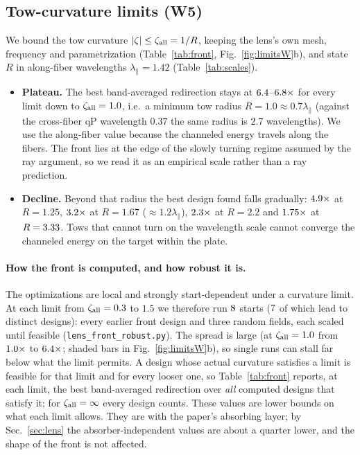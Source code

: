 \subsection{Tow-curvature limits (W5)}\label{sec:front}
We bound the tow curvature $|\zeta|\le\zeta_{\rm all}=1/R$, keeping the lens's own mesh, frequency and
parametrization (Table~\ref{tab:front}, Fig.~\ref{fig:limitsW}b), and state $R$ in along-fiber wavelengths
$\lambda_\parallel=1.42$ (Table~\ref{tab:scales}).
\begin{itemize}[itemsep=1pt]
\item \textbf{Plateau.} The best band-averaged redirection stays at $6.4$--$6.8\times$ for every
  limit down to $\zeta_{\rm all}=1.0$, i.e.\ a minimum tow radius $R=1.0\approx0.7\lambda_\parallel$ (against the
  cross-fiber qP wavelength $0.37$ the same radius is $2.7$ wavelengths). We use the along-fiber value
  because the channeled energy travels along the fibers. The front lies at the edge of the slowly
  turning regime assumed by the ray argument, so we read it as an empirical scale rather than a ray
  prediction.
\item \textbf{Decline.} Beyond that radius the best design found falls gradually: $4.9\times$ at
  $R=1.25$, $3.2\times$ at $R=1.67$ ($\approx1.2\lambda_\parallel$), $2.3\times$ at $R=2.2$ and
  $1.75\times$ at $R=3.33$. Tows that cannot turn on the wavelength scale cannot converge the
  channeled energy on the target within the plate.
\end{itemize}
\paragraph{How the front is computed, and how robust it is.} The optimizations are local and strongly
start-dependent under a curvature limit. At each limit from $\zeta_{\rm all}=0.3$ to $1.5$ we therefore run
$8$ starts ($7$ of which lead to distinct designs): every earlier front design and
three random fields, each scaled until feasible (\texttt{lens\_\allowbreak front\_\allowbreak robust.py}). The
spread is large (at $\zeta_{\rm all}=1.0$ from $1.0\times$ to $6.4\times$; shaded bars in
Fig.~\ref{fig:limitsW}b), so single runs can stall far below what the limit permits. A design whose actual
curvature satisfies a limit is feasible for that limit and for every looser one, so Table~\ref{tab:front}
reports, at each limit, the best band-averaged redirection over \emph{all} computed designs that satisfy
it; for $\zeta_{\rm all}=\infty$ every design counts. These values are lower bounds on what each limit allows.
They are with the paper's absorbing layer; by Sec.~\ref{sec:lens} the absorber-independent values are about
a quarter lower, and the shape of the front is not affected.

